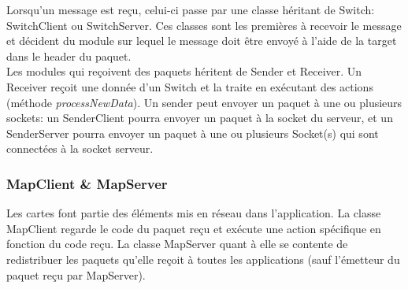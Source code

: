 Lorsqu'un message est reçu, celui-ci passe par une classe héritant de Switch: SwitchClient ou SwitchServer. Ces classes sont les premières à recevoir le message et décident du module sur lequel le message doit être envoyé à l'aide de la target dans le header du paquet.\\

Les modules qui reçoivent des paquets héritent de Sender et Receiver. Un Receiver reçoit une donnée d'un Switch et la traite en exécutant des actions (méthode \emph{processNewData}). Un sender peut envoyer un paquet à une ou plusieurs sockets: un SenderClient pourra envoyer un paquet à la socket du serveur, et un SenderServer pourra envoyer un paquet à une ou plusieurs Socket(s) qui sont connectées à la socket serveur.\\

\subsubsection{MapClient \& MapServer}
Les cartes font partie des éléments mis en réseau dans l'application. La classe MapClient regarde le code du paquet reçu et exécute une action spécifique en fonction du code reçu. La classe MapServer quant à elle se contente de redistribuer les paquets qu'elle reçoit à toutes les applications (sauf l'émetteur du paquet reçu par MapServer).\\

